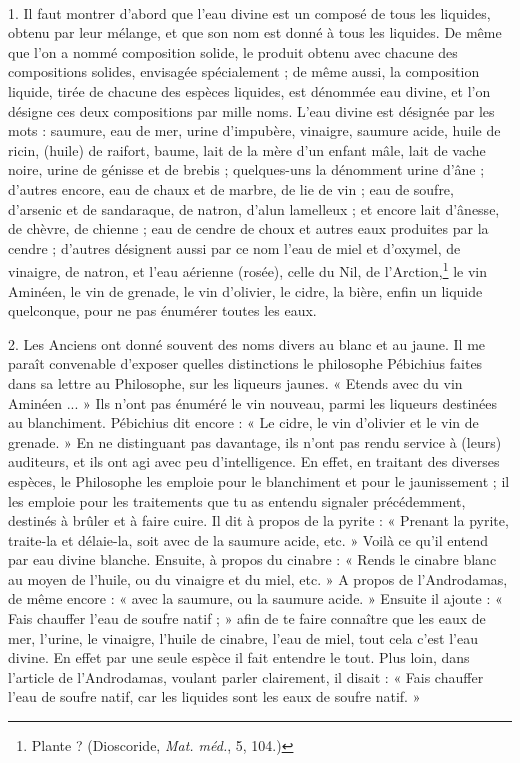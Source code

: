 \documentclass[a4paper, 11pt, oneside, polutonikogreek, french]{article}
\begin{document}
\paragraph{}
1. Il faut montrer d'abord que l'eau divine est un composé de tous les liquides, obtenu par leur mélange, et que son nom est donné à tous les liquides. De même que l'on a nommé composition solide, le produit obtenu avec chacune des compositions solides, envisagée spécialement ; de même aussi, la composition liquide, tirée de chacune des espèces liquides, est dénommée eau divine, et l'on désigne ces deux compositions par mille noms. L'eau divine est désignée par les mots : saumure, eau de mer, urine d'impubère, vinaigre, saumure acide, huile de ricin, (huile) de raifort, baume, lait de la mère d'un enfant mâle, lait de vache noire, urine de génisse et de brebis ; quelques-uns la dénomment urine d'âne ; d'autres encore, eau de chaux et de marbre, de lie de vin ; eau de soufre, d'arsenic et de sandaraque, de natron, d'alun lamelleux ; et encore lait d'ânesse, de chèvre, de chienne ; eau de cendre de choux et autres eaux produites par la cendre ; d'autres désignent aussi par ce nom l'eau de miel et d'oxymel, de vinaigre, de natron, et l'eau aérienne (rosée), celle du Nil, de l'Arction,\footnote{Plante ? (Dioscoride, \emph{Mat. méd.}, 5, 104.)} le vin Aminéen, le vin de grenade, le vin d'olivier, le cidre, la bière, enfin un liquide quelconque, pour ne pas énumérer toutes les eaux.

2. Les Anciens ont donné souvent des noms divers au blanc et au jaune. Il me paraît convenable d'exposer quelles distinctions le philosophe Pébichius faites dans sa lettre au Philosophe, sur les liqueurs jaunes. « Etends avec du vin Aminéen ... » Ils n'ont pas énuméré le vin nouveau, parmi les liqueurs destinées au blanchiment. Pébichius dit encore : « Le cidre, le vin d'olivier et le vin de grenade. » En ne distinguant pas davantage, ils n'ont pas rendu service à (leurs) auditeurs, et ils ont agi avec peu d'intelligence. En effet, en traitant des diverses espèces, le Philosophe les emploie pour le blanchiment et pour le jaunissement ; il les emploie pour les traitements que tu as entendu signaler précédemment, destinés à brûler et à faire cuire. Il dit à propos de la pyrite : « Prenant la pyrite, traite-la et délaie-la, soit avec de la saumure acide, etc. » Voilà ce qu'il entend par eau divine blanche. Ensuite, à propos du cinabre : « Rends le cinabre blanc au moyen de l'huile, ou du vinaigre et du miel, etc. » A propos de l'Androdamas, de même encore : « avec la saumure, ou la saumure acide. » Ensuite il ajoute : « Fais chauffer l'eau de soufre natif ; » afin de te faire connaître que les eaux de mer, l'urine, le vinaigre, l'huile de cinabre, l'eau de miel, tout cela c'est l'eau divine. En effet par une seule espèce il fait entendre le tout. Plus loin, dans l'article de l'Androdamas, voulant parler clairement, il disait : « Fais chauffer l'eau de soufre natif, car les liquides sont les eaux de soufre natif. »
\end{document}
